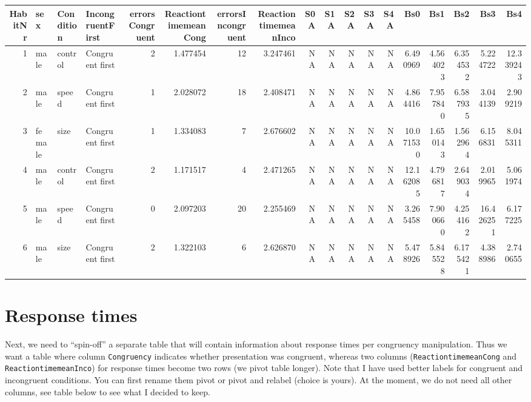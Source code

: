 \documentclass[
]{book}
\begin{document}
\begin{tabular}{r|l|l|l|r|r|r|r|r|r|r|r|r|r|r|r|r|r}
\hline
HabitNr & sex & Condition & IncongruentFirst & errorsCongruent & ReactiontimemeanCong & errorsIncongruent & ReactiontimemeanInco & S0A & S1A & S2A & S3A & S4A & Bs0 & Bs1 & Bs2 & Bs3 & Bs4\\
\hline
1 & male & control & Congruent first & 2 & 1.477454 & 12 & 3.247461 & NA & NA & NA & NA & NA & 6.490969 & 4.564023 & 6.354532 & 5.224722 & 12.339243\\
\hline
2 & male & speed & Congruent first & 1 & 2.028072 & 18 & 2.408471 & NA & NA & NA & NA & NA & 4.864416 & 7.957840 & 6.587935 & 3.044139 & 2.909219\\
\hline
3 & female & size & Congruent first & 1 & 1.334083 & 7 & 2.676602 & NA & NA & NA & NA & NA & 10.071530 & 1.650143 & 1.562964 & 6.156831 & 8.045311\\
\hline
4 & male & control & Congruent first & 2 & 1.171517 & 4 & 2.471265 & NA & NA & NA & NA & NA & 12.162085 & 4.796817 & 2.649034 & 2.019965 & 5.061974\\
\hline
5 & male & speed & Congruent first & 0 & 2.097203 & 20 & 2.255469 & NA & NA & NA & NA & NA & 3.265458 & 7.900660 & 4.254162 & 16.426251 & 6.177225\\
\hline
6 & male & size & Congruent first & 2 & 1.322103 & 6 & 2.626870 & NA & NA & NA & NA & NA & 5.478926 & 5.845528 & 6.175421 & 4.388986 & 2.740655\\
\hline
\end{tabular}

\hypertarget{response-times-1}{%
\section{Response times}\label{response-times-1}}

Next, we need to ``spin-off'' a separate table that will contain information about response times per congruency manipulation. Thus we want a table where column \texttt{Congruency} indicates whether presentation was congruent, whereas two columns (\texttt{ReactiontimemeanCong} and \texttt{ReactiontimemeanInco}) for response times become two rows (we pivot table longer). Note that I have used better labels for congruent and incongruent conditions. You can first rename them pivot or pivot and relabel (choice is yours). At the moment, we do not need all other columns, see table below to see what I decided to keep.
\end{document}
